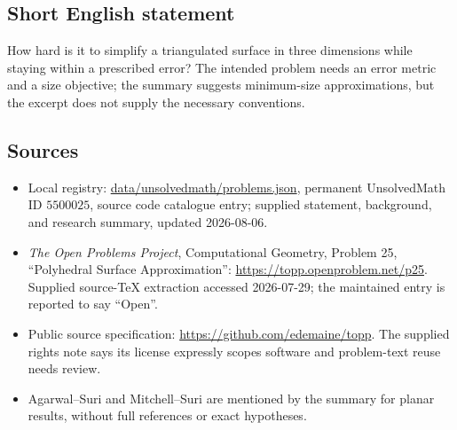 \documentclass[11pt]{article}
\begin{document}
\subsection{Short English statement}
How hard is it to simplify a triangulated surface in three dimensions while staying within a prescribed error? The intended problem needs an error metric and a size objective; the summary suggests minimum-size approximations, but the excerpt does not supply the necessary conventions.
\subsection{Sources}
\begin{itemize}
\item Local registry: \url{data/unsolvedmath/problems.json}, permanent UnsolvedMath ID \(5500025\), source code catalogue entry; supplied statement, background, and research summary, updated 2026-08-06.
\item \emph{The Open Problems Project}, Computational Geometry, Problem 25, ``Polyhedral Surface Approximation'': \url{https://topp.openproblem.net/p25}. Supplied source-TeX extraction accessed 2026-07-29; the maintained entry is reported to say ``Open''.
\item Public source specification: \url{https://github.com/edemaine/topp}. The supplied rights note says its license expressly scopes software and problem-text reuse needs review.
\item Agarwal--Suri and Mitchell--Suri are mentioned by the summary for planar results, without full references or exact hypotheses.
\end{itemize}
\end{document}
